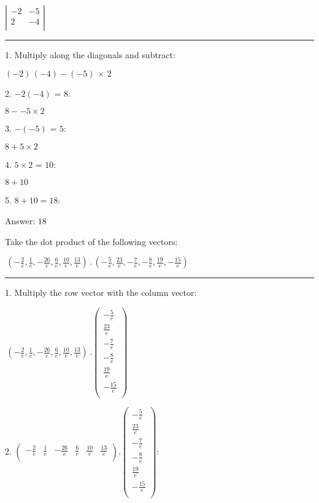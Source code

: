 \documentclass{article}
\begin{document}
$\left| 
\begin{array}{cc}
-2 & -5 \\
 2 & -4 \\
\end{array}
\right|$

\hrule

1. Multiply along the diagonals and subtract:

$(-2)\, (-4)-(-5)\, \times \, 2$

2. $-2 (-4)\text{ = }8:$

$8--5\times 2$

3. $-(-5)\text{ = }5:$

$8+5\times 2$

4. $5\times 2\text{ = }10:$

$8+10$

5. $8+10=18:$

Answer: $18$

\pagebreak

Take the dot product of the following vectors:

$\, \left(-\frac{2}{e},\frac{1}{e},-\frac{26}{e},\frac{6}{e},\frac{10}{e},\frac{13}{e}\right)\, .\, \left(-\frac{5}{e},\frac{23}{e},-\frac{7}{e},-\frac{8}{e},\frac{19}{e},-\frac{15}{e}\right)\,$

\hrule

1. Multiply the row vector with the column vector:

$\, \left(-\frac{2}{e},\frac{1}{e},-\frac{26}{e},\frac{6}{e},\frac{10}{e},\frac{13}{e}\right)\, .\left(
\begin{array}{c}
-\frac{5}{e} \\
 \frac{23}{e} \\
 -\frac{7}{e} \\
 -\frac{8}{e} \\
 \frac{19}{e} \\
 -\frac{15}{e} \\
\end{array}
\right)$

2. $\left(
\begin{array}{cccccc}
-\frac{2}{e} & \frac{1}{e} & -\frac{26}{e} & \frac{6}{e} & \frac{10}{e} & \frac{13}{e} \\
\end{array}
\right).\left(
\begin{array}{c}
-\frac{5}{e} \\
 \frac{23}{e} \\
 -\frac{7}{e} \\
 -\frac{8}{e} \\
 \frac{19}{e} \\
 -\frac{15}{e} \\
\end{array}
\right):$
\end{document}
